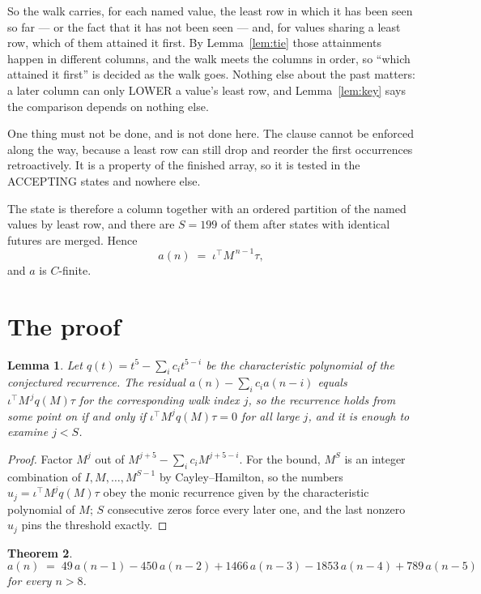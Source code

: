 \documentclass[11pt,a4paper]{article}
\theoremstyle{plain}
\newtheorem{theorem}{Theorem}
\newtheorem{lemma}[theorem]{Lemma}
\theoremstyle{definition}
\begin{document}
So the walk carries, for each named value, the least row in which it has been seen so far ---
or the fact that it has not been seen --- and, for values sharing a least row, which of them
attained it first. By Lemma~\ref{lem:tie} those attainments happen in different columns, and
the walk meets the columns in order, so ``which attained it first'' is decided as the walk
goes. Nothing else about the past matters: a later column can only LOWER a value's least row,
and Lemma~\ref{lem:key} says the comparison depends on nothing else.

One thing must not be done, and is not done here. The clause cannot be enforced along the way,
because a least row can still drop and reorder the first occurrences retroactively. It is a
property of the finished array, so it is tested in the ACCEPTING states and nowhere else.

The state is therefore a column together with an ordered partition of the named values by least
row, and there are $S=199$ of them after states with identical futures are merged. Hence
\[
a(n)\;=\;\iota^{\!\top}M^{\,n-1}\tau,
\]
and $a$ is $C$-finite.

\section{The proof}

\begin{lemma}\label{lem:crit}
Let $q(t)=t^{5}-\sum_i c_it^{5-i}$ be the characteristic polynomial of the
conjectured recurrence. The residual $a(n)-\sum_ic_ia(n-i)$ equals
$\iota^{\!\top}M^{\,j}q(M)\tau$ for the corresponding walk index $j$, so the recurrence
holds from some point on if and only if $\iota^{\!\top}M^{j}q(M)\tau=0$ for all large $j$,
and it is enough to examine $j<S$.
\end{lemma}

\begin{proof}
Factor $M^{j}$ out of $M^{j+5}-\sum_ic_iM^{j+5-i}$. For the bound, $M^{S}$
is an integer combination of $I,M,\dots,M^{S-1}$ by Cayley--Hamilton, so the numbers
$u_j=\iota^{\!\top}M^{j}q(M)\tau$ obey the monic recurrence given by the characteristic
polynomial of $M$; $S$ consecutive zeros force every later one, and the last nonzero $u_j$
pins the threshold exactly.
\end{proof}

\begin{theorem}
\[
a(n)\;=\;49\,a(n-1) - 450\,a(n-2) + 1466\,a(n-3) - 1853\,a(n-4) + 789\,a(n-5)
\]
for every $n>8$.
\end{theorem}
\end{document}
